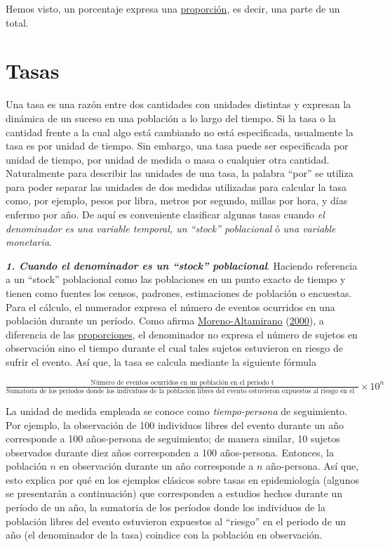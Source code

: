 \documentclass[
  11pt,
]{book}
\begin{document}
Hemos visto, un porcentaje expresa una \protect\hyperlink{proporciuxf3n}{proporción}, es decir, una parte de un total.

\hypertarget{tasas}{%
\chapter{Tasas}\label{tasas}}

Una tasa es una razón entre dos cantidades con unidades distintas y expresan la dinámica de un suceso en una población a lo largo del tiempo. Si la tasa o la cantidad frente a la cual algo está cambiando no está especificada, usualmente la tasa es por unidad de tiempo. Sin embargo, una tasa puede ser especificada por unidad de tiempo, por unidad de medida o masa o cualquier otra cantidad. Naturalmente para describir las unidades de una tasa, la palabra ``por'' se utiliza para poder separar las unidades de dos medidas utilizadas para calcular la tasa como, por ejemplo, pesos por libra, metros por segundo, millas por hora, y días enfermo por año. De aquí es conveniente clasificar algunas tasas cuando \emph{el denominador es una variable temporal, un ``stock'' poblacional} ó \emph{una variable monetaria}.

\textbf{\emph{1. Cuando el denominador es un ``stock'' poblacional}}. Haciendo referencia a un ``stock'' poblacional como las poblaciones en un punto exacto de tiempo y tienen como fuentes los censos, padrones, estimaciones de población o encuestas. Para el cálculo, el numerador expresa el número de eventos ocurridos en una población durante un período. Como afirma \protect\hyperlink{ref-moreno2000principales}{Moreno-Altamirano} (\protect\hyperlink{ref-moreno2000principales}{2000}), a diferencia de las \protect\hyperlink{proporcion}{proporciones}, el denominador no expresa el número de sujetos en observación sino el tiempo durante el cual tales sujetos estuvieron en riesgo de sufrir el evento. Así que, la tasa se calcula mediante la siguiente fórmula

\(\frac{\text{Número de eventos ocurridos en un población en el periodo t}}{\text{Sumatoria de los periodos donde los individuos de la población libres del evento estuvieron expuestos al riesgo en el periodo t}}\times 10^n\)

La unidad de medida empleada se conoce como \emph{tiempo-persona} de seguimiento. Por ejemplo, la observación de 100 individuos libres del evento durante un año corresponde a 100 años-persona de seguimiento; de manera similar, 10 sujetos observados durante diez años corresponden a 100 años-persona. Entonces, la población \(n\) en observación durante un año corresponde a \(n\) año-persona. Así que, esto explica por qué en los ejemplos clásicos sobre tasas en epidemiología (algunos se presentarán a continuación) que corresponden a estudios hechos durante un período de un año, la sumatoria de los períodos donde los individuos de la población libres del evento estuvieron expuestos al ``riesgo'' en el periodo de un año (el denominador de la tasa) coindice con la población en observación.
\end{document}
